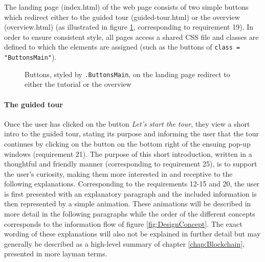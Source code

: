 The landing page (index.html) of the web page consists of two simple buttons which redirect either to the guided tour (guided-tour.html) or the overview (overview.html) (as illustrated in figure \ref{fig:ButtonStyle}, corresponding to requirement 19). In order to ensure consistent style, all pages access a shared CSS file and classes are defined to which the elements are assigned (such as the buttons of \texttt{class = "ButtonsMain"}).  

\begin{figure}
    \centering
    
    \caption{Buttons, styled by \texttt{.ButtonsMain}, on the landing page redirect to either the tutorial or the overview}
    \label{fig:ButtonStyle}
\end{figure}

\paragraph{The guided tour} Once the user has clicked on the button \textit{Let's start the tour}, they view a short intro to the guided tour, stating its purpose and informing the user that the tour continues by clicking on the button on the bottom right of the ensuing pop-up windows (requirement 21). The purpose of this short introduction, written in a thoughtful and friendly manner (corresponding to requirement 25), is to support the user's curiosity, making them more interested in and receptive to the following explanations. Corresponding to the requirements 12-15 and 20, the user is first presented with an explanatory paragraph and the included information is then represented by a simple animation. These animations will be described in more detail in the following paragraphs while the order of the different concepts corresponds to the information flow of figure \ref{fig:DesignConcept}. The exact wording of these explanations will also not be explained in further detail but may generally be described as a high-level summary of chapter \ref{chap:Blockchain}, presented in more layman terms.

